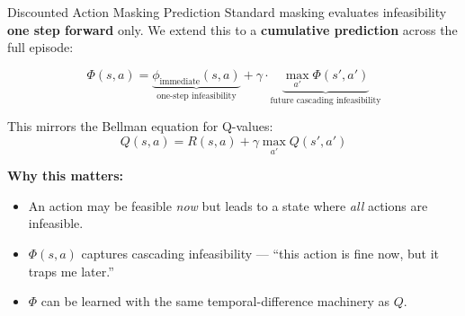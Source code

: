 \documentclass[11pt,aspectratio=169]{beamer}
\begin{document}
\begin{frame}{Discounted Action Masking Prediction}
    Standard masking evaluates infeasibility \textbf{one step forward} only. We extend this to a \textbf{cumulative prediction} across the full episode:

    \begin{equation}
        \Phi(s, a) = \underbrace{\phi_{\text{immediate}}(s, a)}_{\text{one-step infeasibility}} + \gamma \cdot \underbrace{\max_{a'} \Phi(s', a')}_{\text{future cascading infeasibility}}
    \end{equation}

    This mirrors the Bellman equation for Q-values:
    \begin{equation}
        Q(s, a) = R(s, a) + \gamma \max_{a'} Q(s', a')
    \end{equation}

    \textbf{Why this matters:}
    \begin{itemize}
        \item An action may be feasible \textit{now} but leads to a state where \textit{all} actions are infeasible.
        \item $\Phi(s, a)$ captures cascading infeasibility — ``this action is fine now, but it traps me later.''
        \item $\Phi$ can be learned with the same temporal-difference machinery as $Q$.
    \end{itemize}
\end{frame}
\end{document}
